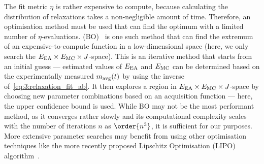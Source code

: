 The fit metric $\eta$ is rather expensive to compute, because calculating the distribution of relaxations takes a non-negligible amount of time.
Therefore, an optimisation method must be used that can find the optimum with a limited number of $\eta$-evaluations.
 (BO)~\cite{bayesopt_package,BayesOpt_Mockus1975} is one such method that can find the extremum of an expensive-to-compute function in a low-dimensional space (here, we only search the $E_\mathrm{EA} \times E_\mathrm{MC} \times J$-space).
This is an iterative method that starts from an initial guess --- estimated values of $E_\mathrm{EA}$ and $E_\mathrm{MC}$ can be determined based on the experimentally measured $m_\mathrm{avg}(t)$ by using the inverse of~\cref{eq:3:relaxation_fit_ab}.
It then explores a region in $E_\mathrm{EA} \times E_\mathrm{MC} \times J$-space by choosing new parameter combinations based on an acquisition function --- here, the upper confidence bound is used.
While BO may not be the most performant method, as it converges rather slowly and its computational complexity scales with the number of iterations $n$ as $\order{n^3}$, it is sufficient for our purposes.
More extensive parameter searches may benefit from using other optimisation techniques like the more recently proposed Lipschitz Optimisation\label{LIPO} (LIPO) algorithm~\cite{LIPO,LIPO_dlib}.

